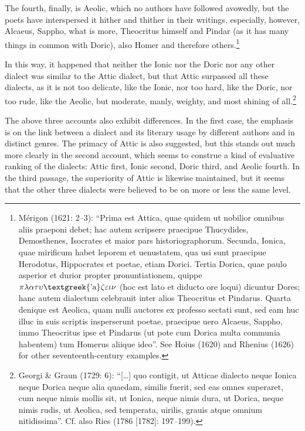 \documentclass[12pt]{article}
\newenvironment{styleStandard}{\renewcommand\baselinestretch{1.25}\setlength\leftskip{0in}\setlength\rightskip{0in}\setlength\parindent{0.1972in}\setlength\parfillskip{0pt plus 1fil}\setlength\parskip{0in plus 1pt}\writerlistparindent\writerlistleftskip\leavevmode\normalfont\normalsize\writerlistlabel\ignorespaces}{\unskip\vspace{0in plus 1pt}\par}
\newenvironment{styleQuote}{\renewcommand\baselinestretch{1.25}\setlength\leftskip{0.3937in}\setlength\rightskip{0in}\setlength\parindent{0in}\setlength\parfillskip{0pt plus 1fil}\setlength\parskip{0.1665in plus 0.016649999in}\writerlistparindent\writerlistleftskip\leavevmode\normalfont\normalsize\writerlistlabel\ignorespaces}{\unskip\vspace{0.1665in plus 0.016649999in}\par}
\newcommand\writerlistleftskip{}
\newcommand\writerlistparindent{}
\newcommand\writerlistlabel{}
\begin{document}
\begin{styleQuote}
The fourth, finally, is Aeolic, which no authors have followed avowedly, but the poets have interspersed it hither and thither in their writings, especially, however, Alcaeus, Sappho, what is more, Theocritus himself and Pindar (as it has many things in common with Doric), also Homer and therefore others.\footnote{ Mérigon (1621: 2–3): “Prima est Attica, quae quidem ut nobilior omnibus aliis praeponi debet; hac autem scripsere praecipue Thucydides, Demosthenes, Isocrates et maior pars historiographorum. Secunda, Ionica, quae mirificum habet leporem et uenustatem, qua usi sunt praecipue Herodotus, Hippocrates et poetae, etiam Dorici. Tertia Dorica, quae paulo asperior et durior propter pronuntiationem, quippe $\pi \lambda \alpha \tau \upsilon \text{\textgreek{'a}}\zeta \varepsilon \iota \nu $ (hoc est lato et diducto ore loqui) dicuntur Dores; hanc autem dialectum celebrauit inter alios Theocritus et Pindarus. Quarta denique est Aeolica, quam nulli auctores ex professo sectati sunt, sed eam huc illuc in suis scriptis insperserunt poetae, praecipue uero Alcaeus, Sappho, immo Theocritus ipse et Pindarus (ut pote cum Dorica multa communia habentem) tum Homerus aliique ideo”. See Hoius (1620) and Rhenius (1626) for other seventeenth-century examples.}
\end{styleQuote}

\begin{styleQuote}
In this way, it happened that neither the Ionic nor the Doric nor any other dialect was similar to the Attic dialect, but that Attic surpassed all these dialects, as it is not too delicate, like the Ionic, nor too hard, like the Doric, nor too rude, like the Aeolic, but moderate, manly, weighty, and most shining of all.\footnote{ Georgi \& Graun (1729: 6): “[…] quo contigit, ut Atticae dialecto neque Ionica neque Dorica neque alia quaedam, similis fuerit, sed eas omnes superaret, cum neque nimis mollis sit, ut Ionica, neque nimis dura, ut Dorica, neque nimis rudis, ut Aeolica, sed temperata, uirilis, grauis atque omnium nitidissima”. Cf. also Ries (1786 [1782]: 197–199).}
\end{styleQuote}

\begin{styleStandard}
The above three accounts also exhibit differences. In the first case, the emphasis is on the link between a dialect and its literary usage by different authors and in distinct genres. The primacy of Attic is also suggested, but this stands out much more clearly in the second account, which seems to construe a kind of evaluative ranking of the dialects: Attic first, Ionic second, Doric third, and Aeolic fourth. In the third passage, the superiority of Attic is likewise maintained, but it seems that the other three dialects were believed to be on more or less the same level.
\end{styleStandard}
\end{document}
